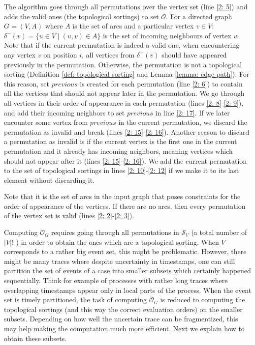 The algorithm goes through all permutations over the vertex set (line \ref{2: 5}) and adds the valid ones (the topological sortings) to set $\mathcal{O}$.
For a directed graph $G=(V,A)$ where $A$ is the set of arcs and a particular vertex $v \in V$: 
$\delta^-(v)=\{u \in V \mid (u,v) \in A\}$ is the set of incoming neighbours of vertex $v$.
Note that if the current permutation is indeed a valid one, when encountering any vertex $v$ on position $i$, all vertices from $\delta^-(v)$ should have appeared previously in the permutation.
Otherwise, the permutation is not a topological sorting (Definition \ref{def: topological sorting} and Lemma \ref{lemma: edge path}).
For this reason, set $previous$ is created for each permutation (line \ref{2: 6}) to contain all the vertices that should not appear later in the permutation.
We go through all vertices in their order of appearance in each permutation (lines \ref{2: 8}-\ref{2: 9}), and add their incoming neighbors to set $previous$ in line \ref{2: 17}.
If we later encounter some vertex from $previous$ in the current permutation, we discard the permutation as invalid and break (lines \ref{2: 15}-\ref{2: 16}).
Another reason to discard a permutation as invalid is if the current vertex is the first one in the current permutation and it already has incoming neighbors, meaning vertices which should not appear after it (lines \ref{2: 15}-\ref{2: 16}).
We add the current permutation to the set of topological sortings in lines \ref{2: 10}-\ref{2: 12} if we make it to its last element without discarding it.

Note that it is the set of arcs in the input graph that poses constraints for the order of appearance of the vertices. 
If there are no arcs, then every permutation of the vertex set is valid (lines \ref{2: 2}-\ref{2: 3}). 

Computing $\mathcal{O}_G$ requires going through all permutations in $\mathcal{S}_V$ (a total number of $|V|!$ ) in order to obtain the ones which are a topological sorting.
When $V$ corresponds to a rather big event set, this might be problematic.
However, there might be many traces where despite uncertainty in timestamps, one can still partition the set of events of a case into smaller subsets which certainly happened sequentially. 
Think for example of processes with rather long traces where overlapping timestamps appear only in local parts of the process.
When the event set is timely partitioned, the task of computing $\mathcal{O}_G$ is reduced to computing the topological sortings (and this way the correct evaluation orders) on the smaller subsets.
Depending on how well the uncertain trace can be fragmentized, this may help making the computation much more efficient.
Next we explain how to obtain  these subsets.
%
%
% 

